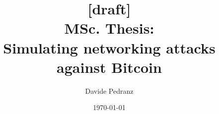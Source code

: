 \documentclass[11pt, a4paper]{report}
\title{[draft]\\MSc. Thesis:\\Simulating networking attacks against Bitcoin}
\author{Davide Pedranz}
\date{\today}
\begin{document}
\begin{titlepage}
	\maketitle
\end{titlepage}

\tableofcontents
\listoffigures





\printbibliography
\end{document}
